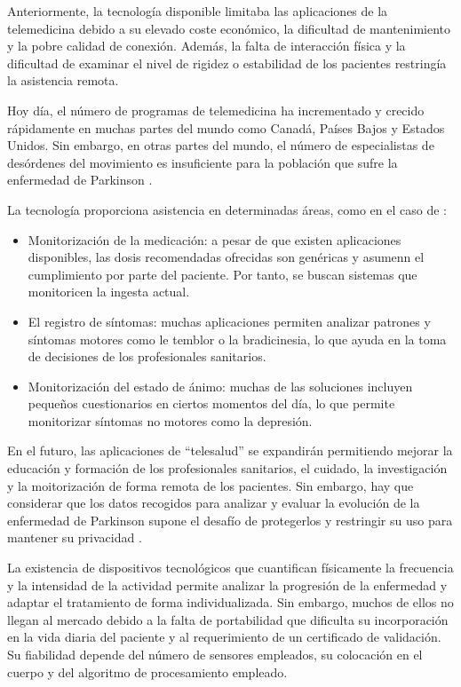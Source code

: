 Anteriormente, la tecnología disponible limitaba las aplicaciones de la telemedicina debido a su elevado coste económico, la dificultad de mantenimiento y la pobre calidad de conexión. Además, la falta de interacción física y la dificultad de examinar el nivel de rigidez o estabilidad de los pacientes restringía la asistencia remota.

Hoy día, el número de programas de telemedicina ha incrementado y crecido rápidamente en muchas partes del mundo como Canadá, Países Bajos y Estados Unidos. Sin embargo, en otras partes del mundo, el número de especialistas de desórdenes del movimiento es insuficiente para la población que sufre la enfermedad de Parkinson \cite{achey2014past}.

La tecnología proporciona asistencia en determinadas áreas, como en el caso de \cite{stamford2015engineering}:

\begin{itemize}
    \item Monitorización de la medicación: a pesar de que existen aplicaciones disponibles, las dosis recomendadas ofrecidas son genéricas y asumenn el cumplimiento por parte del paciente. Por tanto, se buscan sistemas que monitoricen la ingesta actual.
    \item El registro de síntomas: muchas aplicaciones permiten analizar patrones y síntomas motores como le temblor o la bradicinesia, lo que ayuda en la toma de decisiones de los profesionales sanitarios. 
    \item Monitorización del estado de ánimo: muchas de las soluciones incluyen pequeños cuestionarios en ciertos momentos del día, lo que permite monitorizar síntomas no motores como la depresión.
\end{itemize}

En el futuro, las aplicaciones de “telesalud” se expandirán permitiendo mejorar la educación y formación de los profesionales sanitarios, el cuidado, la investigación y la moitorización de forma remota de los pacientes. Sin embargo, hay que considerar que los datos recogidos para analizar y evaluar la evolución de la enfermedad de Parkinson supone el desafío de protegerlos y restringir su uso para mantener su privacidad \cite{achey2014past}.


La existencia de dispositivos tecnológicos que cuantifican físicamente la frecuencia y la intensidad de la actividad permite analizar la progresión de la enfermedad y adaptar el tratamiento de forma individualizada. Sin embargo, muchos de ellos no llegan al mercado debido a la falta de portabilidad que dificulta su incorporación en la vida diaria del paciente y al requerimiento de un certificado de validación. Su fiabilidad depende del número de sensores empleados, su colocación en el cuerpo y del algoritmo de procesamiento empleado. 

